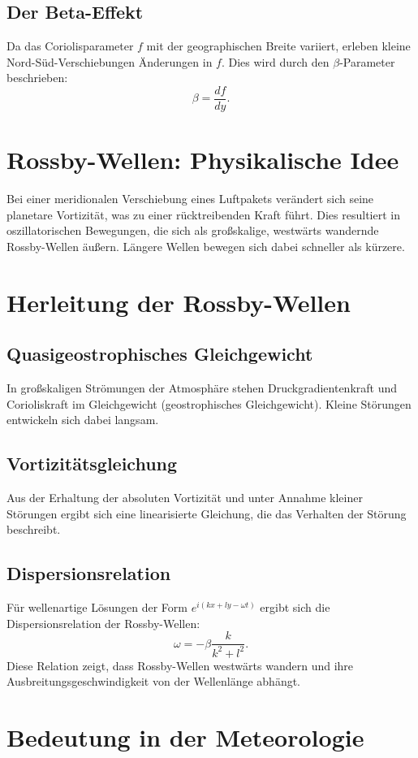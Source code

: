 \begin{refsection}
\subsection{Der Beta-Effekt}
Da das Coriolisparameter \( f \) mit der geographischen Breite variiert, erleben kleine Nord-Süd-Verschiebungen Änderungen in \( f \). Dies wird durch den \(\beta\)-Parameter beschrieben:
\[
\beta = \frac{df}{dy}.
\]

\section{Rossby-Wellen: Physikalische Idee}
Bei einer meridionalen Verschiebung eines Luftpakets verändert sich seine planetare Vortizität, was zu einer rücktreibenden Kraft führt. Dies resultiert in oszillatorischen Bewegungen, die sich als großskalige, westwärts wandernde Rossby-Wellen äußern. Längere Wellen bewegen sich dabei schneller als kürzere.

\section{Herleitung der Rossby-Wellen}

\subsection{Quasigeostrophisches Gleichgewicht}
In großskaligen Strömungen der Atmosphäre stehen Druckgradientenkraft und Corioliskraft im Gleichgewicht (geostrophisches Gleichgewicht). Kleine Störungen entwickeln sich dabei langsam.

\subsection{Vortizitätsgleichung}
Aus der Erhaltung der absoluten Vortizität und unter Annahme kleiner Störungen ergibt sich eine linearisierte Gleichung, die das Verhalten der Störung beschreibt.

\subsection{Dispersionsrelation}
Für wellenartige Lösungen der Form \( e^{i(kx + ly - \omega t)} \) ergibt sich die Dispersionsrelation der Rossby-Wellen:
\[
\omega = -\beta \frac{k}{k^2 + l^2}.
\]
Diese Relation zeigt, dass Rossby-Wellen westwärts wandern und ihre Ausbreitungsgeschwindigkeit von der Wellenlänge abhängt.

\section{Bedeutung in der Meteorologie}


\end{refsection}
